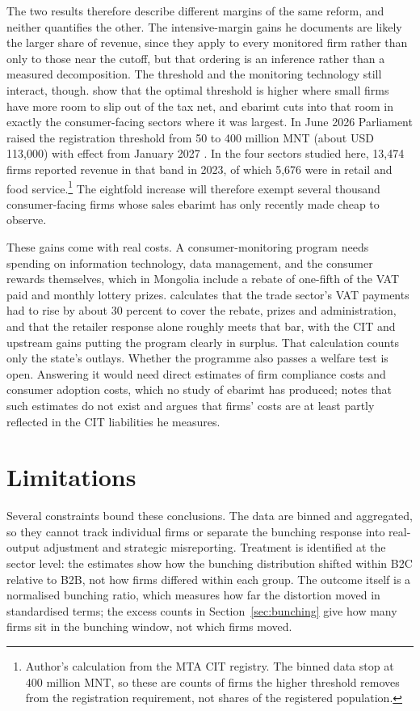\documentclass[12pt,oneside,a4paper]{report}
\begin{document}
The two results therefore describe different margins of the same reform, and neither quantifies the other. The intensive-margin gains he documents are likely the larger share of revenue, since they apply to every monitored firm rather than only to those near the cutoff, but that ordering is an inference rather than a measured decomposition. The threshold and the monitoring technology still interact, though. \textcite{kanbur2014thresholds} show that the optimal threshold is higher where small firms have more room to slip out of the tax net, and ebarimt cuts into that room in exactly the consumer-facing sectors where it was largest. In June 2026 Parliament raised the registration threshold from 50 to 400 million MNT (about USD 113,000) with effect from January 2027 \parencite{vatamendment2026}. In the four sectors studied here, 13,474 firms reported revenue in that band in 2023, of which 5,676 were in retail and food service.\footnote{Author's calculation from the MTA CIT registry. The binned data stop at 400 million MNT, so these are counts of firms the higher threshold removes from the registration requirement, not shares of the registered population.} The eightfold increase will therefore exempt several thousand consumer-facing firms whose sales ebarimt has only recently made cheap to observe.

These gains come with real costs. A consumer-monitoring program needs spending on information technology, data management, and the consumer rewards themselves, which in Mongolia include a rebate of one-fifth of the VAT paid and monthly lottery prizes. \textcite{nyamdavaa2023does} calculates that the trade sector's VAT payments had to rise by about 30 percent to cover the rebate, prizes and administration, and that the retailer response alone roughly meets that bar, with the CIT and upstream gains putting the program clearly in surplus. That calculation counts only the state's outlays. Whether the programme also passes a welfare test is open. Answering it would need direct estimates of firm compliance costs and consumer adoption costs, which no study of ebarimt has produced; \textcite{nyamdavaa2023does} notes that such estimates do not exist and argues that firms' costs are at least partly reflected in the CIT liabilities he measures.

\section{Limitations}
\label{sec:limitations}

Several constraints bound these conclusions. The data are binned and aggregated, so they cannot track individual firms or separate the bunching response into real-output adjustment and strategic misreporting. Treatment is identified at the sector level: the estimates show how the bunching distribution shifted within B2C relative to B2B, not how firms differed within each group. The outcome itself is a normalised bunching ratio, which measures how far the distortion moved in standardised terms; the excess counts in Section~\ref{sec:bunching} give how many firms sit in the bunching window, not which firms moved.
\end{document}
